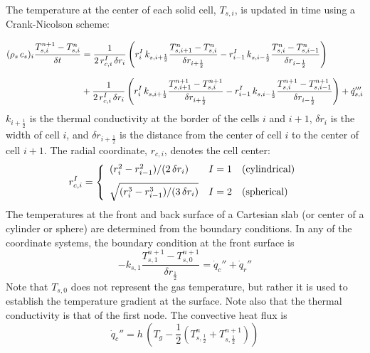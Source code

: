 The temperature at the center of each solid cell, $T_{s,i}$, is updated in time using a Crank-Nicolson scheme:

\begin{align}
\label{crank-nicolson}
(\rho_s \, c_s)_i \frac{T_{s,i}^{n+1}-T_{s,i}^{n}}{\delta t}
& = \frac{1}{2 \, r_{c,i}^I \, \delta r_i} \left( r_{i}^{I} \, k_{s,i+\frac{1}{2}} \frac{T_{s,i+1}^{n}-T_{s,i}^{n}}{\delta r_{i+\frac{1}{2}}} - r_{i-1}^{I} \, k_{s,i-\frac{1}{2}} \frac{T_{s,i}^{n}-T_{s,i-1}^{n}}{\delta r_{i-\frac{1}{2}}} \right) \notag \\[0.1in]
& +\frac{1}{2 \, r_{c,i}^I \, \delta r_i} \left( r_{i}^{I} \, k_{s,i+\frac{1}{2}} \frac{T_{s,i+1}^{n+1}-T_{s,i}^{n+1}}{\delta r_{i+\frac{1}{2}}} - r_{i-1}^{I} \, k_{s,i-\frac{1}{2}} \frac{T_{s,i}^{n+1}-T_{s,i-1}^{n+1}}{\delta r_{i-\frac{1}{2}}} \right) + \dot{q}'''_{s,i}
\end{align}
$k_{i+\frac{1}{2}}$ is the thermal conductivity at the border of the cells $i$ and $i+1$, $\delta r_i$ is the width of cell $i$, and  $\delta r_{i+\frac{1}{2}}$ is the distance from the center of cell $i$ to the center of cell $i+1$. The radial coordinate, $r_{c,i}$, denotes the cell center:
\begin{equation}
r_{c,i}^I = \left\{
\begin{array}{ll} (r_i^2 - r_{i-1}^2)/(2 \, \delta r_i)            & I=1 \quad \hbox{(cylindrical)} \\ [0.1in]
                   \sqrt{ ( r_i^3 - r_{i-1}^3)/(3 \, \delta r_i) } & I=2 \quad \hbox{(spherical)}
\end{array} \right.
\end{equation}
The temperatures at the front and back surface of a Cartesian slab (or center of a cylinder or sphere) are determined from the boundary conditions. In any of the coordinate systems, the boundary condition at the front surface is
\begin{equation}
\label{bc_front}
 -k_{s,1} \frac{T_{s,1}^{n+1}-T_{s,0}^{n+1}}{\delta r_{\frac{1}{2}}}
  =  \dot{q}_{c}''+\dot{q}_{r}''
\end{equation}
Note that $T_{s,0}$ does not represent the gas temperature, but rather it is used to establish the temperature gradient at the surface. Note also that the thermal conductivity is that of the first node. The convective heat flux is
\begin{equation}
\label{conv}
  \dot{q}_c'' = h \, \left( T_g - \frac{1}{2} \left( T_{s,\frac{1}{2}}^n+T_{s,\frac{1}{2}}^{n+1} \right) \right)
\end{equation}
